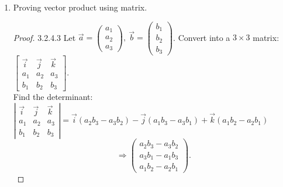 \documentclass[12pt, a4paper]{article}
\begin{document}
\begin{enumerate}
\begin{itemize}
\begin{proof}{3.2.4.2}{}
\begin{figure}[H]
      \end{figure}
      Since the base is not a parallelogram but a triangle, that is half an area of the parallelogram, we multiply $\frac{1}{2}$ in front of the expression of the cross product.
      $$\text{Base}=\frac{1}{2}\left|\vec{a}\times\vec{b}\right|.$$
      The volume of a pyramid is $\frac{1}{3}$ of the product of the base and the height. 
      $$\therefore V=\frac{1}{3}\text{Base}\cdot h=\frac{1}{3}\cdot\frac{1}{2}\left|\vec{a}\times\vec{b}\right|\left|\vec{c}\right|\left|\cos\theta\right|=\frac{1}{6}\left|\left(\vec{a}\times\vec{b}\right)\cdot\vec{c}\right|$$ 
    \end{proof}
  \end{itemize}
  \item Proving vector product using matrix. 
  \begin{proof}{3.2.4.3}{}
    Let $\vec{a}=\begin{pmatrix}a_1\\a_2\\a_3\end{pmatrix},\ \vec{b}=\begin{pmatrix}b_1\\b_2\\b_3\end{pmatrix}$. Convert into a $3\times 3$ matrix: $\begin{bmatrix}\vec{i}&\vec{j}&\vec{k}\\a_1&a_2&a_3\\b_1&b_2&b_3\end{bmatrix}.$\\
    Find the determinant: $\left|\begin{matrix}\vec{i}&\vec{j}&\vec{k}\\a_1&a_2&a_3\\b_1&b_2&b_3\end{matrix}\right|=\vec{i}(a_2b_3-a_3b_2)-\vec{j}(a_1b_3-a_3b_1)+\vec{k}(a_1b_2-a_2b_1)$
    $$\Rightarrow \begin{pmatrix}a_2b_3-a_3b_2\\a_3b_1-a_1b_3\\a_1b_2-a_2b_1\end{pmatrix}.$$
  \end{proof}
\end{enumerate}
\end{document}

